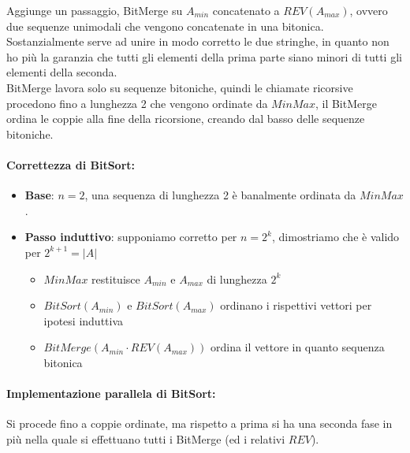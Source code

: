\documentclass[11pt]{article}
\begin{document}
	Aggiunge un passaggio, BitMerge su $A_{min}$ concatenato a $REV(A_{max})$, ovvero due sequenze unimodali che vengono concatenate in una bitonica. Sostanzialmente serve ad unire in modo corretto le due stringhe, in quanto non ho più la garanzia che tutti gli elementi della prima parte siano minori di tutti gli elementi della seconda.\\
	
	BitMerge lavora solo su sequenze bitoniche, quindi le chiamate ricorsive procedono fino a lunghezza 2 che vengono ordinate da $MinMax$, il BitMerge ordina le coppie alla fine della ricorsione, creando dal basso delle sequenze bitoniche.\\
	
	\paragraph{Correttezza di BitSort:}
	\begin{itemize}
		\item \textbf{Base}: $n=2$, una sequenza di lunghezza 2 è banalmente ordinata da $MinMax$.\\
		
		\item \textbf{Passo induttivo}: supponiamo corretto per $n=2^k$, dimostriamo che è valido per $2^{k+1} = |A|$
		\begin{itemize}
			\item $MinMax$ restituisce $A_{min}$ e $A_{max}$ di lunghezza $2^k$
			\item $BitSort (A_{min})$ e $BitSort (A_{max})$ ordinano i rispettivi vettori per ipotesi induttiva
			\item $BitMerge(A_{min} \cdot REV(A_{max}))$ ordina il vettore in quanto sequenza bitonica
		\end{itemize}
		\nn
	\end{itemize} 
	
	\newpage
	
	\paragraph{Implementazione parallela di BitSort:} Si procede fino a coppie ordinate, ma rispetto a prima si ha una seconda fase in più nella quale si effettuano tutti i BitMerge (ed i relativi $REV$).\\
	
\end{document}
